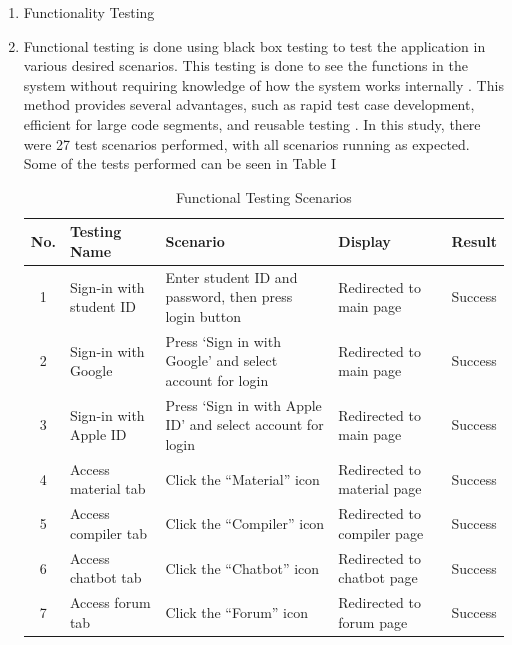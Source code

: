 \documentclass[conference,a4paper]{IEEEtran}
\begin{document}
\begin{enumerate}[label=\alph*.]
  \item Functionality Testing
  \item [] Functional testing is done using black box testing to test the application in various desired scenarios. This testing is done to see the functions in the system without requiring knowledge of how the system works internally \cite{b24}. This method provides several advantages, such as rapid test case development, efficient for large code segments, and reusable testing \cite{b25}. In this study, there were 27 test scenarios performed, with all scenarios running as expected. Some of the tests performed can be seen in Table I

        \begin{table}[H]
          \centering
          \scriptsize
          \caption{Functional Testing Scenarios}
          \label{tab:functional-part1}
          \begin{tabular}{|c|p{1cm}|p{2cm}|p{2cm}|p{1cm}|}
            \hline
            \textbf{No.} & \textbf{Testing Name}   & \textbf{Scenario}                                          & \textbf{Display}                  & \textbf{Result} \\ \hline
            1            & Sign-in with student ID & Enter student ID and password, then press login button     & Redirected to main page           & Success         \\ \hline
            2            & Sign-in with Google     & Press ‘Sign in with Google’ and select account for login   & Redirected to main page           & Success         \\ \hline
            3            & Sign-in with Apple ID   & Press ‘Sign in with Apple ID’ and select account for login & Redirected to main page           & Success         \\ \hline
            4            & Access material tab     & Click the “Material” icon                                  & Redirected to material page       & Success         \\ \hline
            5            & Access compiler tab     & Click the “Compiler” icon                                  & Redirected to compiler page       & Success         \\ \hline
            6            & Access chatbot tab      & Click the “Chatbot” icon                                   & Redirected to chatbot page        & Success         \\ \hline
            7            & Access forum tab        & Click the “Forum” icon                                     & Redirected to forum page          & Success         \\ \hline

\end{tabular}
\end{table}
\end{enumerate}
\end{document}
